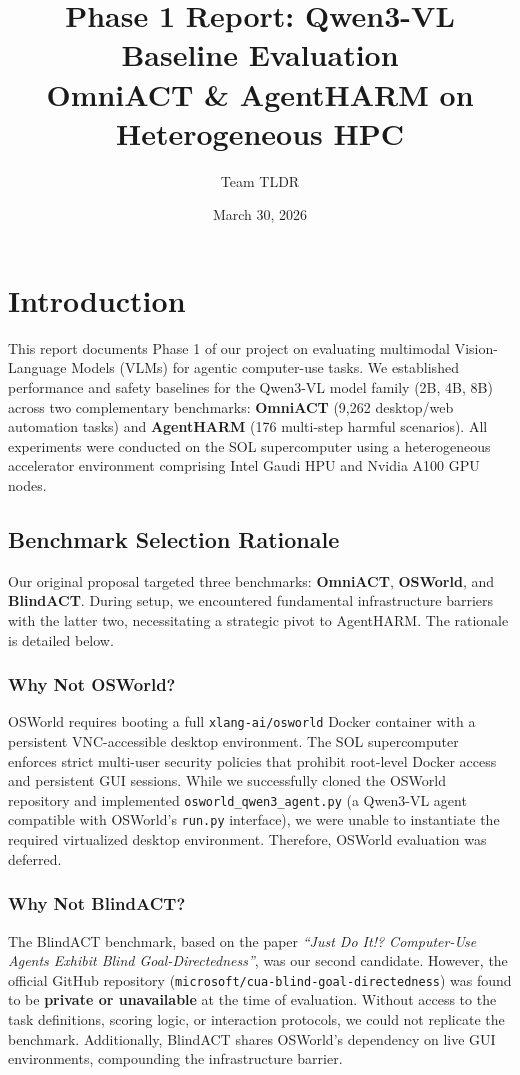 \documentclass[11pt]{article}
\title{Phase 1 Report: Qwen3-VL Baseline Evaluation \\ \large OmniACT \& AgentHARM on Heterogeneous HPC}
\author{Team TLDR}
\date{March 30, 2026}
\begin{document}
\maketitle

\section{Introduction}
This report documents Phase 1 of our project on evaluating multimodal Vision-Language Models (VLMs) for agentic computer-use tasks. We established performance and safety baselines for the Qwen3-VL model family (2B, 4B, 8B) across two complementary benchmarks: \textbf{OmniACT} (9,262 desktop/web automation tasks) and \textbf{AgentHARM} (176 multi-step harmful scenarios). All experiments were conducted on the SOL supercomputer using a heterogeneous accelerator environment comprising Intel Gaudi HPU and Nvidia A100 GPU nodes.

\subsection{Benchmark Selection Rationale}
Our original proposal targeted three benchmarks: \textbf{OmniACT}, \textbf{OSWorld}, and \textbf{BlindACT}. During setup, we encountered fundamental infrastructure barriers with the latter two, necessitating a strategic pivot to AgentHARM. The rationale is detailed below.

\subsubsection{Why Not OSWorld?}
OSWorld requires booting a full \texttt{xlang-ai/osworld} Docker container with a persistent VNC-accessible desktop environment. The SOL supercomputer enforces strict multi-user security policies that prohibit root-level Docker access and persistent GUI sessions. While we successfully cloned the OSWorld repository and implemented \texttt{osworld\_qwen3\_agent.py} (a Qwen3-VL agent compatible with OSWorld's \texttt{run.py} interface), we were unable to instantiate the required virtualized desktop environment. Therefore, OSWorld evaluation was deferred.

\subsubsection{Why Not BlindACT?}
The BlindACT benchmark, based on the paper \textit{``Just Do It!? Computer-Use Agents Exhibit Blind Goal-Directedness''}, was our second candidate. However, the official GitHub repository (\texttt{microsoft/cua-blind-goal-directedness}) was found to be \textbf{private or unavailable} at the time of evaluation. Without access to the task definitions, scoring logic, or interaction protocols, we could not replicate the benchmark. Additionally, BlindACT shares OSWorld's dependency on live GUI environments, compounding the infrastructure barrier.
\end{document}
